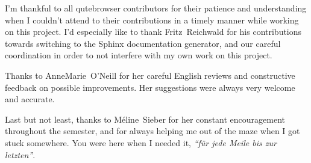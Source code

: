 I'm thankful to all qutebrowser contributors for their patience and
understanding when I couldn't attend to their contributions in a timely manner
while working on this project. I'd especially like to thank Fritz~Reichwald for
his contributions towards switching to the Sphinx documentation generator, and
our careful coordination in order to not interfere with my own work on this
project. 

Thanks to AnneMarie~O'Neill for her careful English reviews and constructive
feedback on possible improvements. Her suggestions were always very welcome and
accurate.

Last but not least, thanks to Méline~Sieber for her constant encouragement
throughout the semester, and for always helping me out of the maze when I got
stuck somewhere. You were here when I needed it, \emph{``für jede Meile bis zur
letzten''}.


